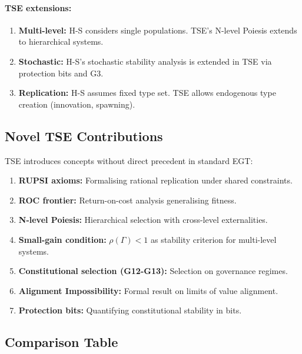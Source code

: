 \documentclass[12pt]{article}
\begin{document}
\paragraph{TSE extensions:}

\begin{enumerate}
\item \textbf{Multi-level:} H-S considers single populations. TSE's N-level Poiesis extends to hierarchical systems.

\item \textbf{Stochastic:} H-S's stochastic stability analysis is extended in TSE via protection bits and G3.

\item \textbf{Replication:} H-S assumes fixed type set. TSE allows endogenous type creation (innovation, spawning).
\end{enumerate}

\subsection{Novel TSE Contributions}

TSE introduces concepts without direct precedent in standard EGT:

\begin{enumerate}
\item \textbf{RUPSI axioms:} Formalising rational replication under shared constraints.

\item \textbf{ROC frontier:} Return-on-cost analysis generalising fitness.

\item \textbf{N-level Poiesis:} Hierarchical selection with cross-level externalities.

\item \textbf{Small-gain condition:} $\rho(\Gamma) < 1$ as stability criterion for multi-level systems.

\item \textbf{Constitutional selection (G12-G13):} Selection on governance regimes.

\item \textbf{Alignment Impossibility:} Formal result on limits of value alignment.

\item \textbf{Protection bits:} Quantifying constitutional stability in bits.
\end{enumerate}

\subsection{Comparison Table}
\end{document}
